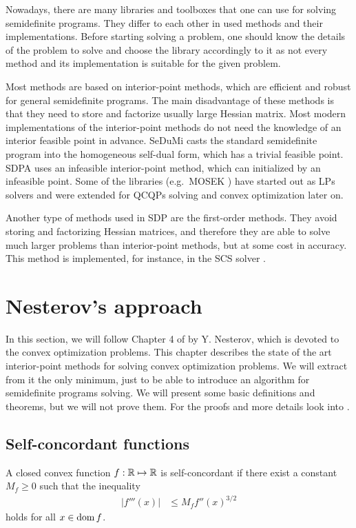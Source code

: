 Nowadays, there are many libraries and toolboxes that one can use for solving semidefinite programs.
They differ to each other in used methods and their implementations.
Before starting solving a problem, one should know the details of the problem to solve and choose the library accordingly to it as not every method and its implementation is suitable for the given problem.

Most methods are based on interior-point methods, which are efficient and robust for general semidefinite programs.
The main disadvantage of these methods is that they need to store and factorize usually large Hessian matrix.
Most modern implementations of the interior-point methods do not need the knowledge of an interior feasible point in advance.
SeDuMi \cite{sedumi} casts the standard semidefinite program into the homogeneous self-dual form, which has a trivial feasible point.
SDPA \cite{sdpa} uses an infeasible interior-point method, which can initialized by an infeasible point.
Some of the libraries (e.g.\ MOSEK \cite{mosek}) have started out as LPs solvers and were extended for QCQPs solving and convex optimization later on.

Another type of methods used in SDP are the first-order methods. 
They avoid storing and factorizing Hessian matrices, and therefore they are able to solve much larger problems than interior-point methods, but at some cost in accuracy.
This method is implemented, for instance, in the SCS solver \cite{scs}.

\section{Nesterov's approach}
In this section, we will follow Chapter 4 of \cite{Nesterov-2004} by Y. Nesterov, which is devoted to the convex optimization problems.
This chapter describes the state of the art interior-point methods for solving convex optimization problems.
We will extract from it the only minimum, just to be able to introduce an algorithm for semidefinite programs solving.
We will present some basic definitions and theorems, but we will not prove them.
For the proofs and more details look into \cite{Nesterov-2004}.

\subsection{Self-concordant functions}
\begin{definition}
  A closed convex function $f: \mathbb{R} \mapsto \mathbb{R}$ is self-concordant if there exist a constant $M_f \geq 0$ such that the inequality
  \begin{align}
    |f'''(x)| &\leq M_f f''(x)^{3/2}
  \end{align}
  holds for all $x\in\operatorname{dom} f$.
\end{definition}

